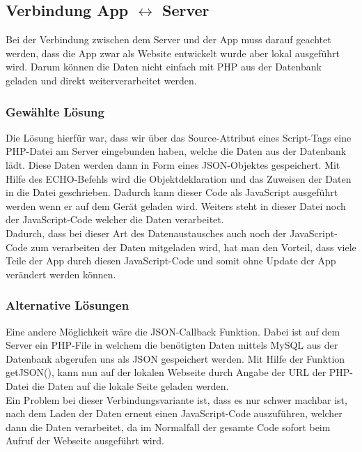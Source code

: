 \subsection{Verbindung App $ \leftrightarrow $ Server}

Bei der Verbindung zwischen dem Server und der App muss darauf geachtet werden, dass die App zwar als Website entwickelt wurde aber lokal ausgeführt wird. Darum können die Daten nicht einfach mit PHP aus der Datenbank geladen und direkt weiterverarbeitet werden.\\

\subsubsection{Gewählte Lösung}
Die Lösung hierfür war, dass wir über das Source-Attribut eines Script-Tags eine PHP-Datei am Server eingebunden haben, welche die Daten aus der Datenbank lädt. Diese Daten werden dann in Form eines JSON-Objektes gespeichert. Mit Hilfe des ECHO-Befehls wird die Objektdeklaration und das Zuweisen der Daten in die Datei geschrieben. Dadurch kann dieser Code als JavaScript ausgeführt werden wenn er auf dem Gerät geladen wird. Weiters steht in dieser Datei noch der JavaScript-Code welcher die Daten verarbeitet.\\
Dadurch, dass bei dieser Art des Datenaustausches auch noch der JavaScript-Code zum verarbeiten der Daten mitgeladen wird, hat man den Vorteil, dass viele Teile der App durch diesen JavaScript-Code und somit ohne Update der App verändert werden können.\\

\subsubsection{Alternative Lösungen}
Eine andere Möglichkeit wäre die JSON-Callback Funktion. Dabei ist auf dem Server ein PHP-File in welchem die benötigten Daten mittels MySQL aus der Datenbank abgerufen uns als JSON gespeichert werden. 
Mit Hilfe der Funktion getJSON(), kann nun auf der lokalen Webseite durch Angabe der URL der PHP-Datei die Daten auf die lokale Seite geladen werden.\\
Ein Problem bei dieser Verbindungsvariante ist, dass es nur schwer machbar ist, nach dem Laden der Daten erneut einen JavaScript-Code auszuführen, welcher dann die Daten verarbeitet, da im Normalfall der gesamte Code sofort beim Aufruf der Webseite ausgeführt wird.\\

%
